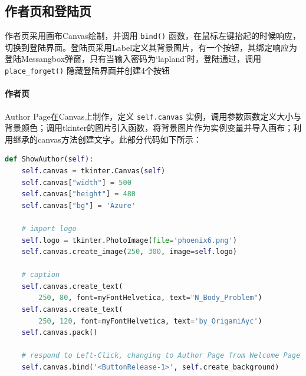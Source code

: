 \documentclass[]{report}
\begin{document}
		\subsection{作者页和登陆页} 作者页采用画布Canvas绘制，并调用 \verb|bind()| 函数，在鼠标左键抬起的时候响应，切换到登陆界面。登陆页采用Label定义其背景图片，有一个按钮，其绑定响应为登陆Messangbox弹窗，只有当输入密码为`lapland'时，登陆通过，调用 \verb|place_forget()| 隐藏登陆界面并创建4个按钮
		\paragraph{作者页} Author Page在Canvas上制作，定义 \verb|self.canvas| 实例，调用参数函数定义大小与背景颜色；调用tkinter的图片引入函数，将背景图片作为实例变量并导入画布；利用继承的canvas方法创建文字。此部分代码如下所示：
		\begin{lstlisting}[language=python, basicstyle=\monaco]
def ShowAuthor(self):
	self.canvas = tkinter.Canvas(self)
	self.canvas["width"] = 500
	self.canvas["height"] = 480
	self.canvas["bg"] = 'Azure'

	# import logo
	self.logo = tkinter.PhotoImage(file='phoenix6.png')
	self.canvas.create_image(250, 300, image=self.logo)

	# caption
	self.canvas.create_text(
		250, 80, font=myFontHelvetica, text="N_Body_Problem")
	self.canvas.create_text(
		250, 120, font=myFontHelvetica, text='by_OrigamiAyc')
	self.canvas.pack()

	# respond to Left-Click, changing to Author Page from Welcome Page
	self.canvas.bind('<ButtonRelease-1>', self.create_background)
		\end{lstlisting}
\end{document}
